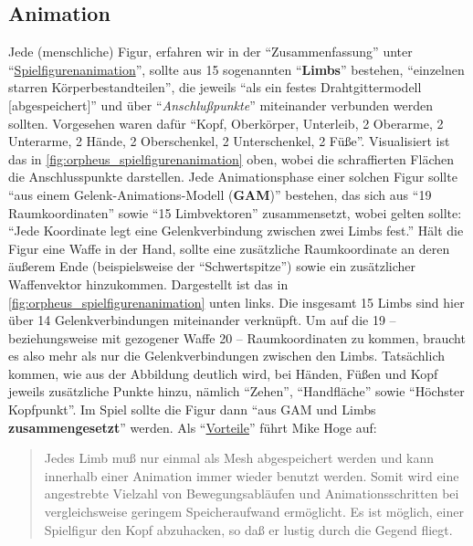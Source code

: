 \documentclass[a5paper,pagesize]{scrbook}
\begin{document}
\subsection{Animation}\label{sec:orpheus_darstellung_animation}
Jede (menschliche) Figur, erfahren wir in der \enquote{Zusammenfassung} unter \enquote{\uline{Spiel\-figurenanimation}}, sollte aus 15 sogenannten \enquote{\textbf{Limbs}} bestehen, \enquote{einzelnen starren Körperbestandteilen}, die jeweils \enquote{als ein festes Drahtgittermodell [abgespeichert]} und über \enquote{\textit{Anschlußpunkte}} miteinander verbunden werden sollten.
Vorgesehen waren dafür \enquote{Kopf, Oberkörper, Unterleib, 2 Oberarme, 2 Unterarme, 2 Hände, 2 Oberschenkel, 2 Unterschenkel, 2 Füße}.
Visualisiert ist das in \autoref{fig:orpheus_spielfigurenanimation} oben, wobei die schraffierten Flächen die Anschlusspunkte darstellen.
Jede Animationsphase einer solchen Figur sollte \enquote{aus einem Gelenk-Animations-Modell (\textbf{GAM})} bestehen, das sich aus \enquote{19 Raumkoordinaten} sowie \enquote{15 Limbvektoren} zusammensetzt, wobei gelten sollte: \enquote{Jede Koordinate legt eine Gelenkverbindung zwischen zwei Limbs fest.}
Hält die Figur eine Waffe in der Hand, sollte eine zusätzliche Raumkoordinate an deren äußerem Ende (beispielsweise der \enquote{Schwertspitze}) sowie ein zusätzlicher Waffenvektor hinzukommen.
Dargestellt ist das in \autoref{fig:orpheus_spielfigurenanimation} unten links.
Die insgesamt 15 Limbs sind hier über 14 Gelenkverbindungen miteinander verknüpft.
Um auf die 19 -- beziehungsweise mit gezogener Waffe 20 -- Raumkoordinaten zu kommen, braucht es also mehr als nur die Gelenkverbindungen zwischen den Limbs.
Tatsächlich kommen, wie aus der Abbildung deutlich wird, bei Händen, Füßen und Kopf jeweils zusätzliche Punkte hinzu, nämlich \enquote{Zehen}, \enquote{Handfläche} sowie \enquote{Höchster Kopfpunkt}.
Im Spiel sollte die Figur dann \enquote{aus GAM und Limbs \textbf{zusammengesetzt}} werden.
Als \enquote{\uline{Vorteile}} führt Mike Hoge auf:

\begin{quote}
   Jedes Limb muß nur einmal als Mesh abgespeichert werden und kann innerhalb einer Animation immer wieder benutzt werden.
   Somit wird eine angestrebte Vielzahl von Bewegungsabläufen und Animationsschritten bei vergleichsweise geringem Speicheraufwand ermöglicht.
   Es ist möglich, einer Spielfigur den Kopf abzuhacken, so daß er lustig durch die Gegend fliegt.
\end{quote}
\end{document}
